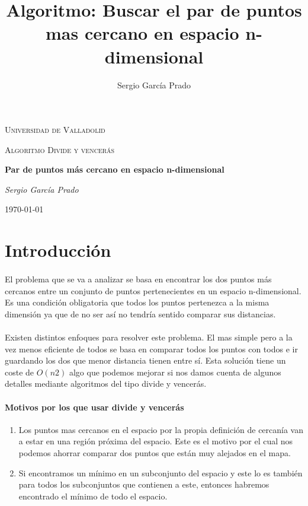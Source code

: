 \documentclass{article}
\title{Algoritmo: Buscar el par de puntos mas cercano en espacio n-dimensional}
\author{Sergio García Prado}
\begin{document}
\begin{titlepage}
	\centering
	{\scshape\LARGE Universidad de Valladolid \par}
	\vspace{1cm}
	{\scshape\Large Algoritmo Divide y vencerás\par}
	\vspace{1.5cm}
	{\huge\bfseries Par de puntos más cercano en espacio n-dimensional\par}
	\vspace{2cm}
	{\Large\itshape Sergio García Prado\par}


	{\large \today\par}
\end{titlepage}

\section{Introducción}

	\paragraph{}
	El problema que se va a analizar se basa en encontrar los dos puntos más cercanos entre un conjunto de puntos pertenecientes en un espacio n-dimensional. Es una condición obligatoria que todos los puntos pertenezca a la misma dimensión ya que de no ser así no tendría sentido comparar sus distancias.

	\paragraph{}
	Existen distintos enfoques para resolver este problema. El mas simple pero a la vez menos eficiente de todos se basa en comparar todos los puntos con todos e ir guardando los dos que menor distancia tienen entre sí. Esta solución tiene un coste de $O(n2)$ algo que podemos mejorar si nos damos cuenta de algunos detalles mediante algoritmos del tipo divide y vencerás.

	\paragraph{Motivos por los que usar divide y vencerás}

		\begin{enumerate}

			\item
			Los puntos mas cercanos en el espacio por la propia definición de cercanía van a estar en una región próxima del espacio. Este es el motivo por el cual nos podemos ahorrar comparar dos puntos que están muy alejados en el mapa.
			\item
			Si encontramos un mínimo en un subconjunto del espacio y este lo es también para todos los subconjuntos que contienen a este, entonces habremos encontrado el mínimo de todo el espacio.

		\end{enumerate}
\end{document}

